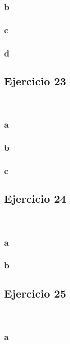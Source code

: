 \documentclass{article}
\begin{document}
\subsubsection*{b}

\subsubsection*{c}

\subsubsection*{d}

\subsection*{Ejercicio 23}

\

\subsubsection*{a}

\subsubsection*{b}

\subsubsection*{c}

\subsection*{Ejercicio 24}

\

\subsubsection*{a}

\subsubsection*{b}

\subsection*{Ejercicio 25}

\

\subsubsection*{a}
\end{document}
